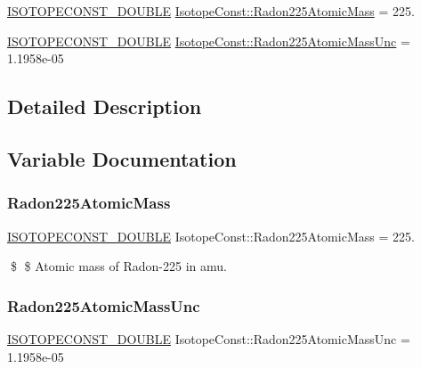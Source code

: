 \begin{DoxyCompactItemize}
\item 
\mbox{\hyperlink{group___isotope_const-_macros_ga8f45a7272ce02c0b4c65c44636ed719a}{I\+S\+O\+T\+O\+P\+E\+C\+O\+N\+S\+T\+\_\+\+D\+O\+U\+B\+LE}} \mbox{\hyperlink{group___isotope_const-_radon-_rn225_ga83af190ec0d384455784f79bea9cb4c4}{Isotope\+Const\+::\+Radon225\+Atomic\+Mass}} = 225.
\item 
\mbox{\hyperlink{group___isotope_const-_macros_ga8f45a7272ce02c0b4c65c44636ed719a}{I\+S\+O\+T\+O\+P\+E\+C\+O\+N\+S\+T\+\_\+\+D\+O\+U\+B\+LE}} \mbox{\hyperlink{group___isotope_const-_radon-_rn225_gaf749acefa4de2c952637f295a44611d5}{Isotope\+Const\+::\+Radon225\+Atomic\+Mass\+Unc}} = 1.\+1958e-\/05
\end{DoxyCompactItemize}


\subsection{Detailed Description}


\subsection{Variable Documentation}
\mbox{\label{group___isotope_const-_radon-_rn225_ga83af190ec0d384455784f79bea9cb4c4}} 
\subsubsection{\texorpdfstring{Radon225\+Atomic\+Mass}{Radon225AtomicMass}}
{\footnotesize\ttfamily \mbox{\hyperlink{group___isotope_const-_macros_ga8f45a7272ce02c0b4c65c44636ed719a}{I\+S\+O\+T\+O\+P\+E\+C\+O\+N\+S\+T\+\_\+\+D\+O\+U\+B\+LE}} Isotope\+Const\+::\+Radon225\+Atomic\+Mass = 225.}

\$ \$ Atomic mass of Radon-\/225 in amu. \mbox{\label{group___isotope_const-_radon-_rn225_gaf749acefa4de2c952637f295a44611d5}} 
\subsubsection{\texorpdfstring{Radon225\+Atomic\+Mass\+Unc}{Radon225AtomicMassUnc}}
{\footnotesize\ttfamily \mbox{\hyperlink{group___isotope_const-_macros_ga8f45a7272ce02c0b4c65c44636ed719a}{I\+S\+O\+T\+O\+P\+E\+C\+O\+N\+S\+T\+\_\+\+D\+O\+U\+B\+LE}} Isotope\+Const\+::\+Radon225\+Atomic\+Mass\+Unc = 1.\+1958e-\/05}

